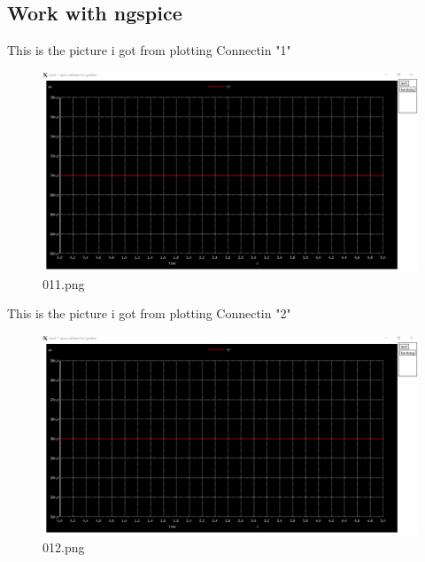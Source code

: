 \documentclass{report}
\begin{document}
\subsection{Work with ngspice}
This is the picture i got from plotting Connectin "1"
\begin{figure}[h]
\includegraphics[scale=0.45]{011.png}
\newline
\centering
\caption{011.png}
\end{figure}
\newpage
This is the picture i got from plotting Connectin "2"
\begin{figure}[h]
\includegraphics[scale=0.45]{012.png}
\newline
\caption{012.png}
\centering
\end{figure}
\newpage
\end{document}
